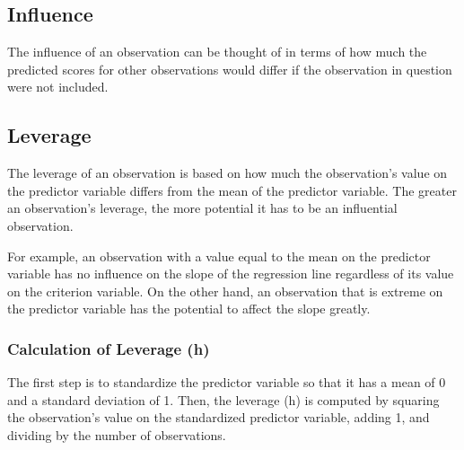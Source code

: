 \documentclass[12pt, a4paper]{article}
\begin{document}
\subsection{Influence}
The influence of an observation can be thought of in terms of how much the predicted scores for other observations would differ if the observation in question were not included. 



\subsection{Leverage}
The leverage of an observation is based on how much the observation's value on the predictor variable differs from the mean of the predictor variable. The greater an observation's leverage, the more potential it has to be an influential observation. 

For example, an observation with a value equal to the mean on the predictor variable has no influence on the slope of the regression line regardless of its value on the criterion variable. On the other hand, an observation that is extreme on the predictor variable has the potential to affect the slope greatly.

\subsubsection{Calculation of Leverage (h)}
The first step is to standardize the predictor variable so that it has a mean of 0 and a standard deviation of 1. Then, the leverage (h) is computed by squaring the observation's value on the standardized predictor variable, adding 1, and dividing by the number of observations.
\end{document}
